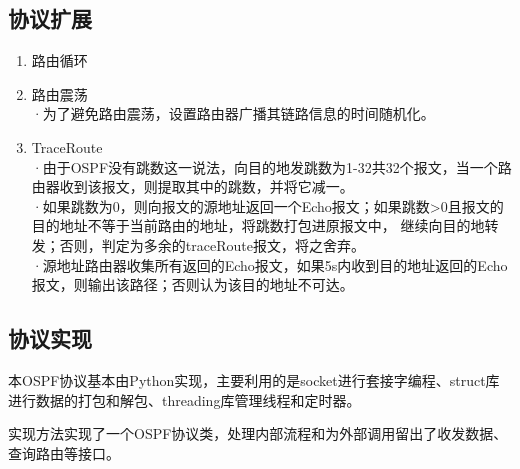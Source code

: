 	\subsection{协议扩展} %
	\label{sub:协议扩展}
		\begin{enumerate}
			\item 路由循环
			\item 路由震荡\\
				·为了避免路由震荡，设置路由器广播其链路信息的时间随机化。
			\item TraceRoute\\
				·由于OSPF没有跳数这一说法，向目的地发跳数为1-32共32个报文，当一个路由器收到该报文，则提取其中的跳数，并将它减一。\\
				·如果跳数为0，则向报文的源地址返回一个Echo报文；如果跳数>0且报文的目的地址不等于当前路由的地址，将跳数打包进原报文中，
				继续向目的地转发；否则，判定为多余的traceRoute报文，将之舍弃。\\
				·源地址路由器收集所有返回的Echo报文，如果5s内收到目的地址返回的Echo报文，则输出该路径；否则认为该目的地址不可达。
		\end{enumerate}
	\subsection{协议实现} %
	\label{sub:协议实现}
		本OSPF协议基本由Python实现，主要利用的是socket进行套接字编程、struct库进行数据的打包和解包、threading库管理线程和定时器。
		\par 实现方法实现了一个OSPF协议类，处理内部流程和为外部调用留出了收发数据、查询路由等接口。
